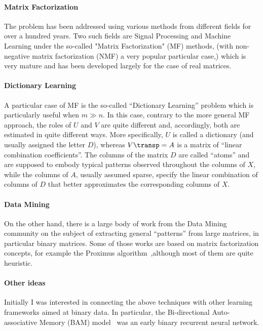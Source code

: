 \documentclass[a4paper]{IEEEtran}
\begin{document}
\paragraph{Matrix Factorization} The problem   has been addressed using various methods from different fields for over a hundred years. Two such fields are Signal Processing and Machine Learning under the so-called "Matrix Factorization" (MF) methods, (with non-negative matrix factorization (NMF) a very popular particular case,) which is very mature and has been developed largely for the case of real matrices.

\paragraph{Dictionary Learning} A particular case of MF is the so-called ``Dictionary Learning'' problem which is particularly useful when $m \gg n$. In this case, contrary to the more general MF approach, the roles of $U$ and $V$ are quite different and, accordingly, both are estimated in quite different ways. More specifically, $U$ is called a dictionary (and usually assigned the letter $D$), whereas $V\transp=A$ is a matrix of ``linear combination coefficients''. The columns of the matrix $D$ are called ``atoms'' and are supposed to embody typical patterns observed throughout the columns of $X$, while the columns of $A$, usually assumed sparse, specify the linear combination of columns of $D$ that better approximates the corresponding columns of $X$.

\paragraph{Data Mining} On the other hand, there is a large body of work from the Data Mining community on the subject of extracting general ``patterns'' from large matrices, in particular binary matrices. Some of those works are based on matrix factorization concepts, for example the Proximus algorithm~\cite{proximus},although most of them are quite heuristic.

\paragraph{Other ideas} Initially I was interested in connecting the above techniques with other learning frameworks aimed at binary data. In particular, the Bi-directional Auto-associative Memory (BAM) model~\cite{bam} was an early binary recurrent neural network.
\end{document}
